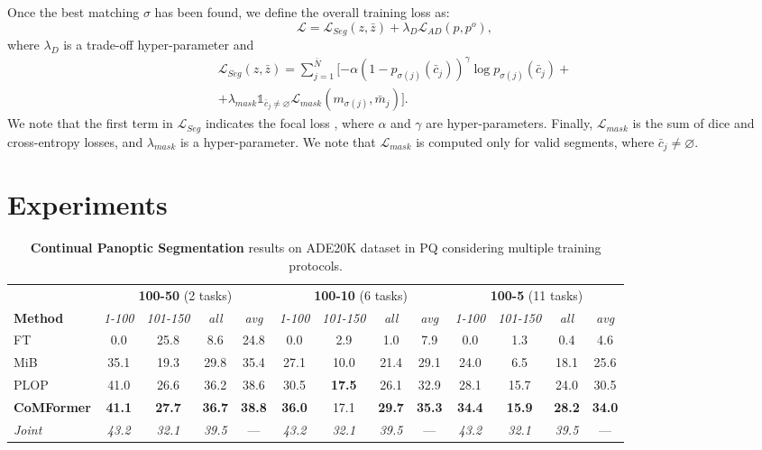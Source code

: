 \documentclass[10pt,twocolumn,letterpaper]{article}
\begin{document}
Once the best matching $\sigma$ has been found, we define the overall training loss as:
\begin{equation}
    \mathcal{L} = \mathcal{L}_{Seg}(z, \bar{z}) + \lambda_D \mathcal{L}_{AD}(p, p^o),
\end{equation}
where $\lambda_D$ is a trade-off hyper-parameter and
\begin{equation}
\begin{aligned}
    \mathcal{L}_{Seg}(z, \bar{z}) = \sum_{j=1}^{\bar{N}} [ - \alpha (1-p_{\sigma(j)}(\bar{c}_j))^\gamma \log p_{\sigma(j)}(\bar{c}_j) + \\ + \lambda_{mask} \mathds{1}_{\bar{c}_j \neq \varnothing} \mathcal{L}_{mask}(m_{\sigma(j)}, \bar{m}_j) ].
\end{aligned}
\end{equation}
We note that the first term in $\mathcal{L}_{Seg}$ indicates the focal loss \cite{lin2017focalloss}, where $\alpha$ and $\gamma$ are hyper-parameters.
Finally, $\mathcal{L}_{mask}$ is the sum of dice and cross-entropy losses, and $\lambda_{mask}$ is a hyper-parameter. We note that $\mathcal{L}_{mask}$ is computed only for valid segments, \ie where $\bar{c}_j \neq \varnothing$. 
\section{Experiments}
\label{sec:exp}


\begin{table*}[t]
\centering
\small
\begin{tabular}{l|cccc|cccc|cccc}
\hline
\multicolumn{1}{c}{} & \multicolumn{4}{c}{{\textbf{100-50} (2 tasks)}}  & \multicolumn{4}{c}{{\textbf{100-10} (6 tasks)}} & \multicolumn{4}{c}{{\textbf{100-5} (11 tasks)}} \\
\textbf{Method}       & \textit{1-100} & \textit{101-150} & \textit{all} & \textit{avg} & \textit{1-100} & \textit{101-150}  & \textit{all} & \textit{avg}  & \textit{1-100} & \textit{101-150} & \textit{all} & \textit{avg}  \\ \hline
FT           &  0.0 & 25.8  & 8.6 & 24.8	&  0.0 &   2.9  &  1.0 & 7.9 &  0.0	&  1.3 	& 0.4 &  4.6  \\ 
MiB          & 35.1 & 19.3  &29.8 & 35.4	& 27.1 &  10.0  & 21.4 & 29.1 & 24.0	&  6.5  &	18.1& 25.6  \\ 
PLOP         & 41.0 & 26.6 &  36.2 & 38.6	& 30.5 &  \textbf{17.5} & 26.1 & 32.9  & 28.1	& 15.7  &	24.0& 30.5  \\ 
\textbf{CoMFormer}    & \textbf{41.1} & \textbf{27.7} & \textbf{36.7} & \textbf{38.8} &\textbf{36.0} &  17.1  & \textbf{29.7}& \textbf{35.3} & \textbf{34.4}	& \textbf{15.9}  &	\textbf{28.2}& \textbf{34.0} \\ \hdashline
\textit{Joint}        & \textit{43.2} & \textit{32.1}  & \textit{39.5} & ---  & \textit{43.2} &  \textit{32.1}   & \textit{39.5} & ---  & \textit{43.2}	& \textit{32.1}   &	\textit{39.5} & --- \\ 
\hline
\end{tabular}
\caption{\textbf{Continual Panoptic Segmentation} results on ADE20K dataset in PQ considering multiple training protocols.}
\label{tab:ade_pan}

\end{table*}
 
\end{document}
